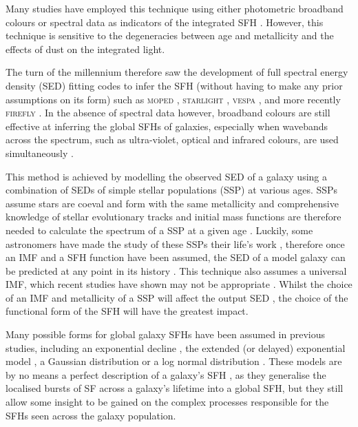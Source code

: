 Many studies have employed this technique using either photometric broadband colours or spectral data as indicators of the integrated SFH \citep[for example][]{deJong96, madau98, davies01, kauffmann03, dressler04, macarthur04, Martin07, perez11, sanchez11, mcdermid15}. However, this technique is sensitive to the degeneracies between age and metallicity \citep{worthey94} and the effects of dust \citep{ganda09, pastrav13} on the integrated light. 

The turn of the millennium therefore saw the development of full spectral energy density (SED) fitting codes to infer the SFH (without having to make any prior assumptions on its form) such as \textsc{moped} \citep{heavens00}, \textsc{starlight} \citep{cidfernandes05}, \textsc{vespa} \citep{tojeiro07}, and more recently \textsc{firefly} \citep{wilkinson15}. In the absence of spectral data however, broadband colours are still effective at inferring the global SFHs of galaxies, especially when wavebands across the spectrum, such as ultra-violet, optical and infrared colours, are used simultaneously \citep{madau98}. 

This method is achieved by modelling the observed SED of a galaxy using a combination of SEDs of simple stellar populations (SSP) at various ages. SSPs assume stars are coeval and form with the same metallicity and comprehensive knowledge of stellar evolutionary tracks and initial mass functions \citep[IMF;][]{salpeter55, chabrier03} are therefore needed to calculate the spectrum of a SSP at a given age \citep{chen10, kriek10}. Luckily, some astronomers have made the study of these SSPs their life's work \citep[for example]{BC03, Maraston05, vazquez05, CGW09}, therefore once an IMF and a SFH function have been assumed, the SED of a model galaxy can be predicted at any point in its history \citep{chen10}. This technique also assumes a universal IMF, which recent studies have shown may not be appropriate \citep{vandokkum08, conroy12, cappellari12, smithr15}. Whilst the choice of an IMF and metallicity of a SSP will affect the output SED \citep{CGW09, kriek10}, the choice of the functional form of the SFH will have the greatest impact. 

Many possible forms for global galaxy SFHs have been assumed in previous studies, including an exponential decline \citep{tinsley72, gavazzi02, weiner06, Martin07, noeske07, kriek10,  schawinski14, hart16}, the extended (or delayed) exponential model \citep{gavazzi02, oemler13, simha14}, a Gaussian distribution \citep{feuillet16} or a log normal distribution \citep{gladders13, abramson16}. These models are by no means a perfect description of a galaxy's SFH \citep{lee10, boquien14, smith15}, as they generalise the localised bursts of SF across a galaxy's lifetime into a global SFH, but they still allow some insight to be gained on the complex processes responsible for the SFHs seen across the galaxy population. 

